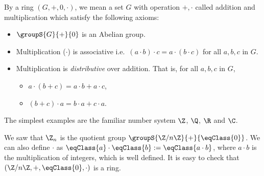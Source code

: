 \begin{Definition}[name=Ring]
    By a ring $\left(G,+,0,\cdot\right)$, we mean a set $G$ with operation $+,\cdot$ called addition and
    multiplication which satisfy the following axioms:
    \begin{itemize}
	\item
	    $\groupS{G}{+}{0}$ is an Abelian group.
	\item
	    Multiplication ($\cdot$) is associative i.e.~$(a\cdot b)\cdot c = a \cdot (b\cdot c)$ for 
	    all $a,b,c$ in $G$.
	\item
	    Multiplication is \emph{distributive} over addition. That is, for all $a,b,c$ in $G$,
	    \begin{itemize}
		\item
		    $a\cdot(b+c) = a\cdot b + a\cdot c$,
		\item
		    $(b+c)\cdot a = b\cdot a + c\cdot a$.
	    \end{itemize}
    \end{itemize}
\end{Definition}
\begin{Example}
    The simplest examples are the familiar number system $\Z$, $\Q$, $\R$ and $\C$.
\end{Example}
\begin{Example}
    We saw that $\Z_{n}$ is the quotient group $\groupS{\Z/n\Z}{+}{\eqClass{0}}$. We can also define $\cdot$
    as $\eqClass{a}\cdot\eqClass{b} := \eqClass{a\cdot b}$, where $a\cdot b$ is the multiplication of integers,
    which is well defined. It is easy to check that $\left(\Z/n\Z,+,\eqClass{0},\cdot\right)$ is a ring. 
\end{Example}

